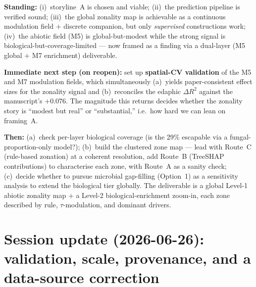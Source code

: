 \documentclass[11pt,a4paper]{article}
\begin{document}
\textbf{Standing:} (i)~storyline~A is chosen and viable; (ii)~the prediction
pipeline is verified sound; (iii)~the global zonality map is achievable as a
continuous modulation field $+$ discrete companion, but only \emph{supervised}
constructions work; (iv)~the abiotic field (M5) is global-but-modest while the
strong signal is biological-but-coverage-limited --- now framed as a finding via
a dual-layer (M5 global $+$ M7 enrichment) deliverable.

\textbf{Immediate next step (on reopen):} set up \textbf{spatial-CV validation}
of the M5 and M7 modulation fields, which simultaneously (a)~yields
paper-consistent effect sizes for the zonality signal and (b)~reconciles the
edaphic $\Delta R^2$ against the manuscript's $+0.076$. The magnitude this returns
decides whether the zonality story is ``modest but real'' or ``substantial,''
i.e.\ how hard we can lean on framing~A.

\textbf{Then:} (a)~check per-layer biological coverage (is the 29\% escapable via
a fungal-proportion-only model?); (b)~build the clustered zone map --- lead with
Route~C (rule-based zonation) at a coherent resolution, add Route~B (TreeSHAP
contributions) to characterise each zone, with Route~A as a sanity check;
(c)~decide whether to pursue microbial gap-filling (Option~1) as a sensitivity
analysis to extend the biological tier globally. The deliverable is a global
Level-1 abiotic zonality map + a Level-2 biological-enrichment zoom-in, each zone
described by rule, $\tau$-modulation, and dominant drivers.

\section{Session update (2026-06-26): validation, scale, provenance,
and a data-source correction}
\end{document}
